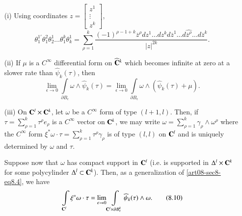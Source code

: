 \begin{remarks*}
\begin{itemize}
\item[(i)] Using coordinates $z=\left[\begin{smallmatrix} z^{1}\\ \vdots \\ z^{k}\end{smallmatrix}\right]$, 
\begin{equation*}
\theta^{1'}_{1}\theta^{2}_{1}\theta^{1}_{2}\ldots\theta^{k}_{1}\theta^{1}_{k}=\sum\limits^{k}_{\rho=1}\frac{(-1)^{\rho-1+k}\overline{z}^{\rho}dz^{1}\ldots dz^{k}d\overline{z}^{1}\ldots d\widehat{\overline{z}^{\rho}}\ldots d\overline{z}^{k}}{|z|^{2k}}.\tag{8.8}\label{art08-sec8-eq8.8}
\end{equation*}

\item[(ii)] If $\mu$ is a $C^{\infty}$ differential form on $\widehat{\mathbf{C}}^{k}$ which becomes infinite at zero at a slower rate than $\widehat{\psi}_{k}(\tau)$, then
\begin{equation*}
\lim\limits_{\epsilon\to 0}\int\limits_{\partial B_{\epsilon}}\omega \wedge \widehat{\psi}_{k}(\tau)=\lim\limits_{\epsilon\to 0}\int\limits_{\partial B_{\epsilon}}\omega\wedge (\widehat{\psi}_{k}(\tau)+\mu).\tag{8.9}\label{art08-sec8-eq8.9}
\end{equation*}

\item[(iii)] On $\mathbf{C}^{l}\times \mathbf{C}^{k}$, let $\omega$ be a $C^{\infty}$ form of type $(l+1,l)$. Then, if $\tau=\sum\limits^{k}_{\rho=1}\tau^{\rho}e_{\rho}$ is a $C^{\infty}$ vector on $\mathbf{C}^{k}$, we may write $\omega=\sum\limits^{k}_{\rho=1}\gamma_{\rho}\wedge \omega^{\rho}$ where the $C^{\infty}$ form $\xi^{*}\omega\cdot \tau=\sum\limits_{\rho=1}^{k}\tau^{\rho}\gamma_{\rho}$ is of type $(l,l)$ on $\mathbf{C}^{l}$ and is uniquely determined by $\omega$ and $\tau$.

Suppose now that $\omega$ has compact support in $\mathbf{C}^{l}$ (i.e. is supported in $\Delta^{l}\times \mathbf{C}^{k}$ for some polycylinder $\Delta^{l}\subset \mathbf{C}^{k}$). Then, as a generalization of \eqref{art08-sec8-eq8.4}, we have
\begin{equation*}
\int\limits_{\mathbf{C}^{l}}\xi^{*}\omega\cdot \tau=\lim\limits_{\epsilon\to 0}\int\limits_{\mathbf{C}^{l}\times \partial B^{k}_{\epsilon}}\widehat{\psi}_{k}(\tau)\wedge \omega.\tag{8.10}\label{art08-sec8-eq8.10}
\end{equation*}\pageoriginale


\end{itemize}
\end{remarks*}
